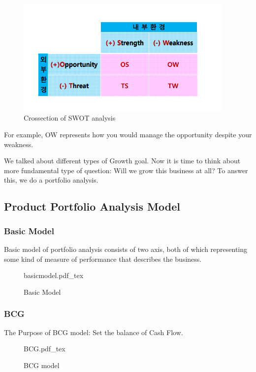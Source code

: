 \documentclass[12pt]{article}
\begin{document}
\begin{figure}[H]
	\centering
	\includegraphics[width=0.95\textwidth]{img/crosssection.png}
	\caption{Crossection of SWOT analysis}
	\label{}
\end{figure}

For example, OW represents how you would manage the opportunity despite your weakness.

We talked about different types of Growth goal. Now it is time to think about more fundamental type of question: Will we grow this business at all? To answer this, we do a portfolio analysis.

\subsection{Product Portfolio Analysis Model}

\subsubsection{Basic Model}
Basic model of portfolio analysis consists of two axis, both of which representing some kind of measure of performance that describes the business.

\begin{figure}[H]
	\centering
	\def\svgwidth{\columnwidth}
	{basicmodel.pdf_tex}
	\caption{Basic Model}
	\label{fig:basicmodel}
\end{figure}

\subsubsection{BCG}


The Purpose of BCG model: Set the balance of Cash Flow.
\begin{figure}[H]
	\centering
	\def\svgwidth{\columnwidth}
	{BCG.pdf_tex}
	\caption{BCG model}
	\label{fig:BCG Model}
\end{figure}
\end{document}
